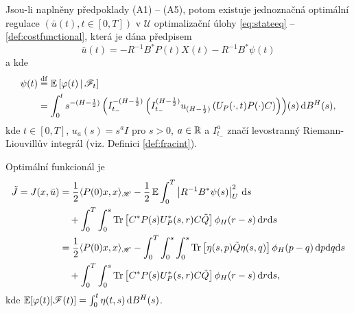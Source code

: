 \begin{veta}
    Jsou-li naplněny předpoklady (A1) -- (A5), potom existuje jednoznačná
    optimální regulace $\left( \bar{u}(t),t\in\left[ 0,T \right] \right)$ v
    $\mathscr{U}$ optimalizační úlohy \eqref{eq:stateeq} -- \eqref{def:costfunctional}, která je dána
    předpisem
    \begin{equation*}
        \bar{u}(t) = -R^{-1} B^* P(t) X(t) - R^{-1} B^* \psi(t)
        \label{optimalcontrol}
    \end{equation*}
    a kde
    \begin{equation*}
        \begin{split}
        \psi(t) &\stackrel{\mathrm{df}}{=} \operatorname{\mathbb{E}} \left[ \varphi(t)\,|\,\mathscr{F}_t \right] \\
        &= \int_0^t s^{-(H-\frac{1}{2})} \left( I_{t_-}^{-( H-\frac{1}{2})}
        \left( I_{t_-}^{(H-\frac{1}{2})} u_{(H-\frac{1}{2})} \left( U_P
        (\cdot,t) P(\cdot) C \right) \right) \right)\! (s) \,\mathrm{d} B^H(s),
    \end{split}
    \end{equation*}
    kde $t\in \left[ 0,T \right]$, $u_a(s)=s^a I$ pro $s>0$, $a\in\mathbb{R}$ a
    $I_{t_-}^a$ značí levostranný Riemann-Liouvillův integrál (viz. Definici
    \eqref{def:fracint}).

    Optimální funkcionál je
    \begin{equation*}
    \begin{split}
        \tilde{J} = J(x,\bar{u}) &= \frac{1}{2} \langle P(0)x,x
        \rangle_\mathscr{H} -\frac{1}{2}\operatorname{\mathbb{E}}\int_0^T \left| R^{-1} B^*
        \psi(s) \right|_U^2 \,\mathrm{d} s \\
        &\quad + \int_0^T \int_0^s \operatorname{Tr} \left[ C^*P(s) U_P^*(s,r) C \tilde{Q} \right]
        \phi_H (r-s) \,\mathrm{d} r\!\,\mathrm{d} s\\
        &= \frac{1}{2} \langle P(0)x,x
        \rangle_\mathscr{H} -
        \int_0^T \int_0^s\int_0^s \operatorname{Tr}\left[ \eta(s,p)\tilde{Q}\eta(s,q) \right]
        \phi_H (p-q) \,\mathrm{d} p\!\,\mathrm{d} q\!\,\mathrm{d} s \\
        &\quad + \int_0^T \int_0^s \operatorname{Tr} \left[ C^*
            P(s) U_P^*(s,r) C \tilde{Q} \right] \phi_H (r-s) \,\mathrm{d} r\!\,\mathrm{d} s,
        \label{}
    \end{split}
    \end{equation*}
    kde $\operatorname{\mathbb{E}}[\varphi(t)|\mathscr{F}(t)]=\int_0^t \eta(t,s)\,\mathrm{d} B^H(s)$.
\end{veta}

